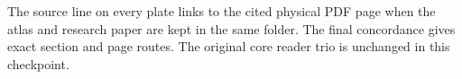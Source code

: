 \documentclass[11pt]{article}
\begin{document}
The source line on every plate links to the cited physical PDF page when the atlas and research paper are kept in the same folder. The final concordance gives exact section and page routes. The original core reader trio is unchanged in this checkpoint.
































\clearpage{}
\end{document}
